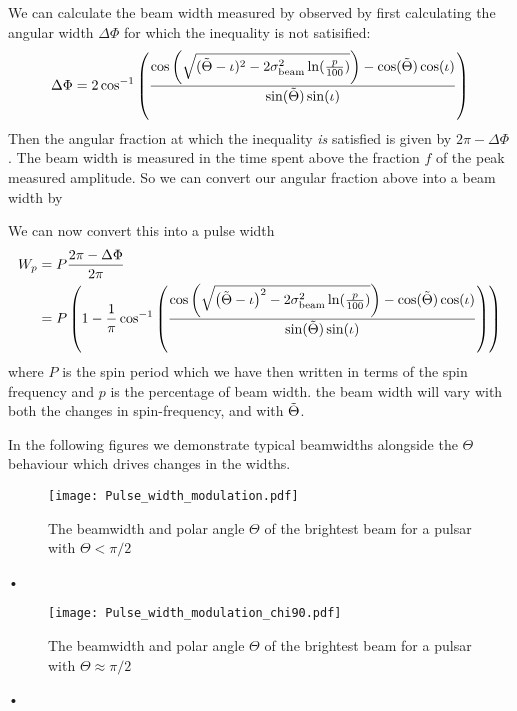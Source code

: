 \documentclass[/home/greg/Thesis/main/main.tex]{subfiles}
\begin{document}
We can calculate the beam width measured by observed by first calculating the
angular width $\Delta\Phi$ for which the inequality is not satisified:
\begin{equation}
    \Delta\Phi = 2\cos^{-1}\left(
                \frac{\cos\left(\sqrt{
                    (\tilde{\Theta} - \iota)^{2}-2\sigma_{\textrm{beam}}^{2} \ln(\frac{p}{100})}\right)-\cos(\tilde{\Theta})\cos(\iota)}
                          {\sin(\tilde{\Theta})\sin(\iota)}
                      \right)
\end{equation}
Then the angular fraction at which the inequality \emph{is} satisfied is given by
$2\pi - \Delta\Phi$. The beam width is measured in the time spent above the 
fraction $f$ of the peak measured amplitude. So we can convert our angular 
fraction above into a beam width by

We can now convert this into a pulse width 
\begin{align}
    W_p & = P \frac{2\pi - \Delta\Phi}{2\pi} \\
          & = P\left(1 -
               \frac{1}{\pi}\cos^{-1}\left(
                   \frac{\cos\left(\sqrt{\left(\tilde{\Theta} - \iota\right)^{2}-2\sigma_{\textrm{beam}}^{2} \ln(\frac{p}{100})}\right)
                    - \cos(\tilde{\Theta})\cos(\iota)}
                          {\sin(\tilde{\Theta})\sin(\iota)}
                      \right)
                  \right)
\label{eqn: Wp}
\end{align}
where $P$ is the spin period which we have then written in terms of the spin
frequency and $p$ is the percentage of beam width. 
the beam width will vary with both the changes in spin-frequency, and with
$\tilde{\Theta}$.

In the following figures we demonstrate typical beamwidths alongside the 
$\Theta$ behaviour which drives changes in the widths.
\begin{figure}[ht]
\centering
\texttt{[image: Pulse\_width\_modulation.pdf]}
\caption{The beamwidth and polar angle $\Theta$ of the brightest beam for a pulsar
         with $\Theta < \pi/2$}
\label{fig: Pulse width modulation}
\end{figure}•

\begin{figure}[ht]
\centering
\texttt{[image: Pulse\_width\_modulation\_chi90.pdf]}
\caption{The beamwidth and polar angle $\Theta$ of the brightest beam for a pulsar
         with $\Theta \approx \pi/2$}
\label{fig: Pulse width modulation chi90}
\end{figure}•


\FloatBarrier
\end{document}
